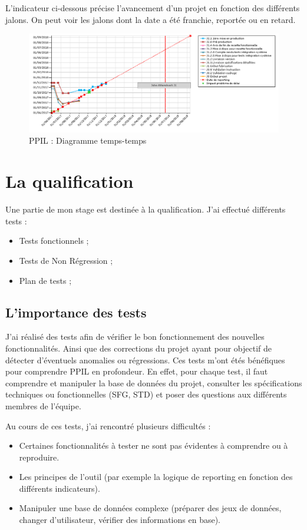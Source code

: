 L'indicateur ci-dessous précise l'avancement d'un projet en fonction des différents jalons. On peut voir les jalons dont la date a été franchie, reportée ou en retard. 

\begin{figure}[H]
\centering
\includegraphics[width=1\textwidth]{images/temps-temps.png}
\caption{PPIL : Diagramme temps-temps}
\end{figure}

\section{La qualification}

Une partie de mon stage est destinée à la qualification. J'ai effectué différents tests :
\begin{itemize}
    \item Tests fonctionnels ; 
    \item Tests de Non Régression ;
    \item Plan de tests ;
\end{itemize}

\subsection{L'importance des tests}

J'ai réalisé des tests afin de vérifier le bon fonctionnement des nouvelles fonctionnalités. Ainsi que des corrections du projet ayant pour objectif de détecter d'éventuels anomalies ou régressions. Ces tests m'ont étés bénéfiques pour comprendre PPIL en profondeur. En effet, pour chaque test, il faut comprendre et manipuler la base de données du projet, consulter les spécifications techniques ou fonctionnelles (SFG, STD) et poser des questions aux différents membres de l'équipe.

Au cours de ces tests, j'ai rencontré plusieurs difficultés : 

\begin{itemize}
    \item Certaines fonctionnalités à tester ne sont pas évidentes à comprendre ou à reproduire.
    \item Les principes de l'outil (par exemple la logique de reporting en fonction des différents indicateurs).
    \item Manipuler une base de données complexe (préparer des jeux de données, changer d'utilisateur, vérifier des informations en base).
\end{itemize}

